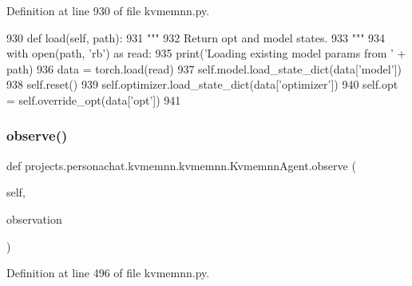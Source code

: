Definition at line 930 of file kvmemnn.\+py.


\begin{DoxyCode}
930     \textcolor{keyword}{def }load(self, path):
931         \textcolor{stringliteral}{"""}
932 \textcolor{stringliteral}{        Return opt and model states.}
933 \textcolor{stringliteral}{        """}
934         with open(path, \textcolor{stringliteral}{'rb'}) \textcolor{keyword}{as} read:
935             print(\textcolor{stringliteral}{'Loading existing model params from '} + path)
936             data = torch.load(read)
937             self.model.load\_state\_dict(data[\textcolor{stringliteral}{'model'}])
938             self.reset()
939             self.optimizer.load\_state\_dict(data[\textcolor{stringliteral}{'optimizer'}])
940             self.opt = self.override\_opt(data[\textcolor{stringliteral}{'opt'}])
941 \end{DoxyCode}
\mbox{\label{classprojects_1_1personachat_1_1kvmemnn_1_1kvmemnn_1_1KvmemnnAgent_af64ed055aff5efbdea21ce93c18c221a}} 
\subsubsection{\texorpdfstring{observe()}{observe()}}
{\footnotesize\ttfamily def projects.\+personachat.\+kvmemnn.\+kvmemnn.\+Kvmemnn\+Agent.\+observe (\begin{DoxyParamCaption}\item[{}]{self,  }\item[{}]{observation }\end{DoxyParamCaption})}



Definition at line 496 of file kvmemnn.\+py.


